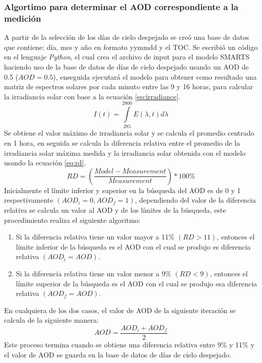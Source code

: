\subsubsection{Algortimo para determinar el AOD correspondiente a la medición}
A partir de la selección de los días de cielo despejado se creó una base de datos que contiene: día, mes y año en formato yymmdd y el TOC. Se escribió un código en el lenguaje \textit{Python}, el cual crea el archivo de input para el modelo SMARTS haciendo uso de la base de datos de días de cielo despejado usando un AOD de 0.5 ($AOD=0.5$), enseguida ejecutará el modelo para obtener como resultado una matriz de espectros solares por cada minuto entre las 9 y 16 horas, para calcular la irradiancia solar con base a la ecuación \ref{eq:irradiance}.
\begin{equation}
    I(t) = \int\limits_{285}^{2800} E(\lambda,t) d\lambda
    \label{eq:irradiance}
\end{equation}
Se obtiene el valor máximo de irradiancia solar y se calcula el promedio centrado en 1 hora, en seguida se calcula la diferencia relativa entre el promedio de la irradiancia solar máxima medida y la irradiancia solar obtenida con el modelo usando la ecuación \ref{eq:rd}.
\begin{equation}
    RD = \left(\frac{Model-Measurement}{Measurement}\right)*100\%
    \label{eq:rd}
\end{equation}
Inicialmente el límite inferior y superior en la búsqueda del AOD es de 0 y 1 respectivamente $(AOD_i=0, AOD_f=1)$, dependiendo del valor de la diferencia relativa se calcula un valor al AOD y de los límites de la búsqueda, este procedimiento realiza el siguiente algoritmo:
\begin{enumerate}
    \item Si la diferencia relativa tiene un valor mayor a 11\% $(RD>11)$, entonces el límite inferior de la búsqueda es el AOD con el cual se produjo es diferencia relativa $(AOD_i=AOD)$.
    \item Si la diferencia relativa tiene un valor menor a 9\% $(RD<9)$, entonces el límite superior de la búsqueda es el AOD con el cual se produjo esa diferencia relativa $(AOD_f=AOD)$.
\end{enumerate}
En cualquiera de los dos casos, el valor de AOD de la siguiente iteración se calcula de la siguiente manera:
\begin{equation*}
    AOD=\frac{AOD_i+AOD_f}{2}
\end{equation*}
Este proceso termina cuando se obtiene una diferencia relativa entre 9\% y 11\% y el valor de AOD se guarda en la base de datos de días de cielo despejado.